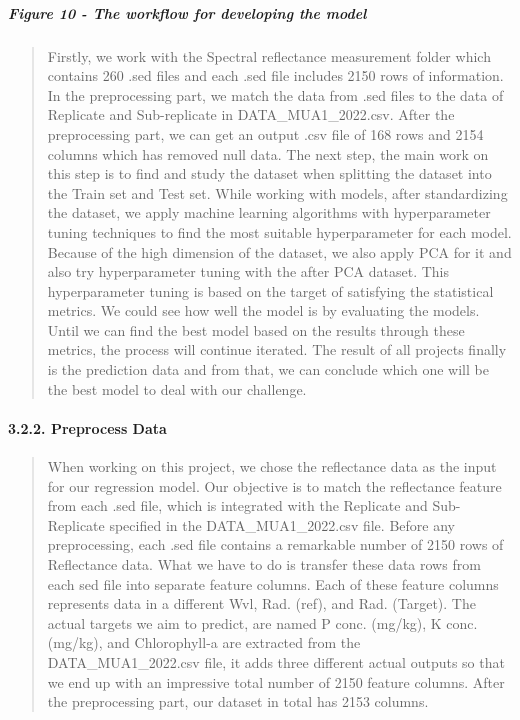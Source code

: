 \documentclass[
]{article}
\begin{document}
\hypertarget{figure-10---the-workflow-for-developing-the-model}{%
\subparagraph{\texorpdfstring{\textbf{Figure 10} - The workflow for
developing the
model}{Figure 10 - The workflow for developing the model}}\label{figure-10---the-workflow-for-developing-the-model}}

\begin{quote}
Firstly, we work with the Spectral reflectance measurement folder which
contains 260 .sed files and each .sed file includes 2150 rows of
information. In the preprocessing part, we match the data from .sed
files to the data of Replicate and Sub-replicate in
DATA\_MUA1\_2022.csv. After the preprocessing part, we can get an output
.csv file of 168 rows and 2154 columns which has removed null data. The
next step, the main work on this step is to find and study the dataset
when splitting the dataset into the Train set and Test set. While
working with models, after standardizing the dataset, we apply machine
learning algorithms with hyperparameter tuning techniques to find the
most suitable hyperparameter for each model. Because of the high
dimension of the dataset, we also apply PCA for it and also try
hyperparameter tuning with the after PCA dataset. This hyperparameter
tuning is based on the target of satisfying the statistical metrics. We
could see how well the model is by evaluating the models. Until we can
find the best model based on the results through these metrics, the
process will continue iterated. The result of all projects finally is
the prediction data and from that, we can conclude which one will be the
best model to deal with our challenge.
\end{quote}

\hypertarget{preprocess-data}{%
\paragraph{\texorpdfstring{\textbf{3.2.2. Preprocess
Data}}{3.2.2. Preprocess Data}}\label{preprocess-data}}

\begin{quote}
When working on this project, we chose the reflectance data as the input
for our regression model. Our objective is to match the reflectance
feature from each .sed file, which is integrated with the Replicate and
Sub-Replicate specified in the DATA\_MUA1\_2022.csv file. Before any
preprocessing, each .sed file contains a remarkable number of 2150 rows
of Reflectance data. What we have to do is transfer these data rows from
each sed file into separate feature columns. Each of these feature
columns represents data in a different Wvl, Rad. (ref), and Rad.
(Target). The actual targets we aim to predict, are named P conc.
(mg/kg), K conc. (mg/kg), and Chlorophyll-a are extracted from the
DATA\_MUA1\_2022.csv file, it adds three different actual outputs so
that we end up with an impressive total number of 2150 feature columns.
After the preprocessing part, our dataset in total has 2153 columns.
\end{quote}
\end{document}
